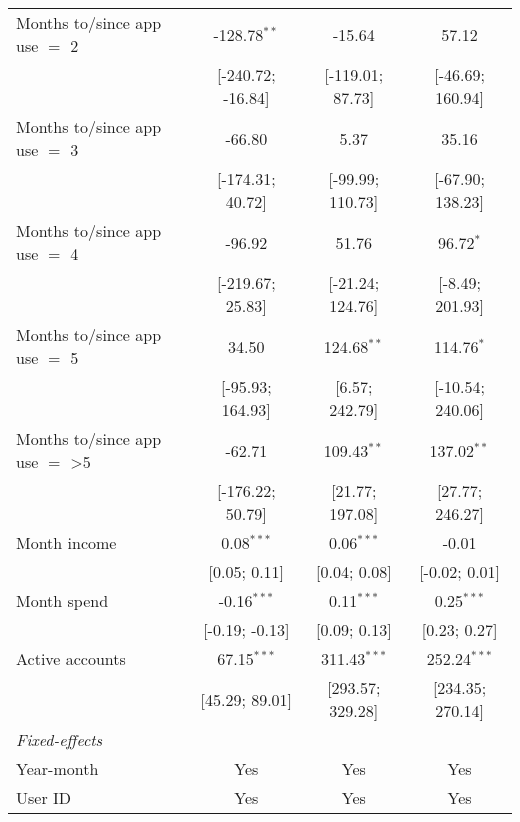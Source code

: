 \begin{table}[htbp]
\begin{threeparttable}[b]
\begin{tabular}{lccc}
         Months to/since app use $=$ 2   & -128.78$^{**}$    & -15.64           & 57.12\\   
                                         & [-240.72; -16.84] & [-119.01; 87.73] & [-46.69; 160.94]\\   
         Months to/since app use $=$ 3   & -66.80            & 5.37             & 35.16\\   
                                         & [-174.31; 40.72]  & [-99.99; 110.73] & [-67.90; 138.23]\\   
         Months to/since app use $=$ 4   & -96.92            & 51.76            & 96.72$^{*}$\\   
                                         & [-219.67; 25.83]  & [-21.24; 124.76] & [-8.49; 201.93]\\   
         Months to/since app use $=$ 5   & 34.50             & 124.68$^{**}$    & 114.76$^{*}$\\   
                                         & [-95.93; 164.93]  & [6.57; 242.79]   & [-10.54; 240.06]\\   
         Months to/since app use $=$ >5  & -62.71            & 109.43$^{**}$    & 137.02$^{**}$\\   
                                         & [-176.22; 50.79]  & [21.77; 197.08]  & [27.77; 246.27]\\   
         Month income                    & 0.08$^{***}$      & 0.06$^{***}$     & -0.01\\   
                                         & [0.05; 0.11]      & [0.04; 0.08]     & [-0.02; 0.01]\\   
         Month spend                     & -0.16$^{***}$     & 0.11$^{***}$     & 0.25$^{***}$\\   
                                         & [-0.19; -0.13]    & [0.09; 0.13]     & [0.23; 0.27]\\   
         Active accounts                 & 67.15$^{***}$     & 311.43$^{***}$   & 252.24$^{***}$\\   
                                         & [45.29; 89.01]    & [293.57; 329.28] & [234.35; 270.14]\\   
         \midrule
         \emph{Fixed-effects}\\
         Year-month                      & Yes               & Yes              & Yes\\  
         User ID                         & Yes               & Yes              & Yes\\  
         \midrule

\end{tabular}
\end{threeparttable}
\end{table}
